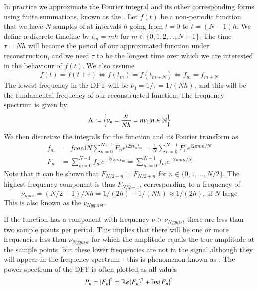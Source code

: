 \documentclass[12pt, a4paper, oneside, openright, titlepage]{book}
\begin{document}
\begin{defn}
        In practice we approximate the Fourier integral and its other corresponding forms using finite summations, known as the . Let $f(t)$ be a non-periodic function that we have $N$ samples of at intervals $h$ going from $t = 0$ to $t = (N-1)h$. We define a discrete timeline by $t_m = mh$ for $m \in \{0,1,2,...,N-1\}$. The time $\tau = Nh$ will become the period of our approximated function under reconstruction, and we need $\tau$ to be the longest time over which we are interested in the behaviour of $f(t)$. We also assume \begin{equation}
                f(t) = f(t+\tau) \iff f(t_m) = f(t_{m+N}) \iff f_m = f_{m+N}
        \end{equation}
        The lowest frequency in the DFT will be $\nu_1 = 1/\tau = 1/(Nh)$, and this will be the fundamental frequency of our reconstructed function. The frequency spectrum is given by \begin{equation}
                \Lambda := \left\{\nu_n = \frac{n}{Nh} = n\nu_1\vert n \in \mathbb N\right\}
        \end{equation}
        We then discretize the integrals for the function and its Fourier transform as \begin{align}
                f_m &= frac{1}{N}\sum_{n=0}^{N-1}F_ne^{i2\pi\nu_nt_m} = \frac{1}{N}\sum_{n=0}^{N-1}F_ne^{i2\pi mn/N} \\
                F_n &= \sum_{m=0}^{N-1}f_me^{-i2\pi\nu_nt_m} = \sum_{m=0}^{N-1}f_me^{-2\pi mn/N}
        \end{align}
        Note that it can be shown that $F_{N/2-n} = \overline{F}_{N/2+n}$ for $n \in \{0,1,...,N/2\}$. The highest frequency component is thus $F_{N/2-1}$, corresponding to a frequency of \begin{equation}
                \nu_{max} = (N/2-1)/Nh = 1/(2h) - 1/(Nh) \approx 1/(2h), \text{ if $N$ large}
        \end{equation}
        This is also known as the  $\nu_{Nyquist}$.


        If the function has a component with frequency $\nu > \nu_{Nyquist}$ there are less than two sample points per period. This implies that there will be one or more frequencies less than $\nu_{Nyquist}$ for which the amplitude equals the true amplitude at the sample points, but these lower frequencies are not in the signal although they will appear in the frequency spectrum - this is phenomenon known as . The power spectrum of the DFT is often plotted as all values \begin{equation}
                P_n = |F_n|^2 = \mathbb R e\{F_n\}^2+\mathbb{I}m\{F_n\}^2
        \end{equation}
\end{defn}
\end{document}
